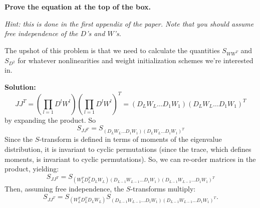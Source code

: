 \documentclass[a4paper]{article}
\begin{document}
\begin{enumerate}[label=(\alph*)]
\begin{centering}
\end{centering}

\textbf{Prove the equation at the top of the box.}

\textit{Hint: this is done in the first appendix of the paper. Note that you should assume free independence of the $D$'s and $W$'s.}

The upshot of this problem is that we need to calculate the quantities $S_{WW^T}$ and $S_{D^2}$ for whatever nonlinearities and weight initialization schemes we're interested in.  


\vspace{10mm}
\begin{tcolorbox}
\textbf{Solution:}
$$JJ^T =\left( \prod_{l=1} D^l W^l\right) \left(\prod_{l=1} D^l W^l\right)^T = \left(D_L W_L \ldots D_1 W_1\right) \left(D_L W_L \ldots D_1 W_1\right)^T$$ by expanding the product.  So 
$$ S_{JJ^T} = S_{\left( D_L W_L \ldots D_1 W_1\right) \left( D_L W_L \ldots D_1 W_1\right)^T} $$
Since the $S$-transform is defined in terms of moments of the eigenvalue distribution, it is invariant to cyclic permutations (since the trace, which defines moments, is invariant to cyclic permutations).  So, we can re-order matrices in the product, yielding:
$$ S_{JJ^T} = S_{(W_L^T D_L^T D_L W_L) (D_{L-1} W_{L-1} \ldots D_1 W_1)(D_{L-1} W_{L-1} \ldots D_1 W_1)^T} $$
Then, assuming free independence, the $S$-transforms multiply:
$$ S_{JJ^T} = S_{(W_L^T D_L^T D_L W_L)} S_{(D_{L-1} W_{L-1} \ldots D_1 W_1)(D_{L-1} W_{L-1} \ldots D_1 W_1)^T}.$$


\end{tcolorbox}
\end{enumerate}
\end{document}
